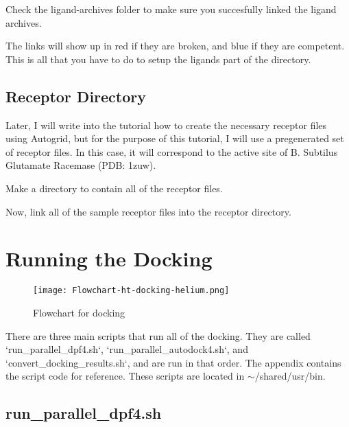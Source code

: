 Check the ligand-archives folder to make sure you succesfully linked the ligand archives.

\begin{quote}
\end{quote}

The links will show up in red if they are broken, and blue if they are competent. This is all that you have to do to setup the ligands part of the directory. 


\subsection{Receptor Directory}

Later, I will write into the tutorial how to create the necessary receptor files using Autogrid, but for the purpose of this tutorial, I will use a pregenerated set of receptor files. In this case, it will correspond to the active site of B. Subtilus Glutamate Racemase (PDB: 1zuw). 

Make a directory to contain all of the receptor files. 

\begin{quote}
\end{quote}

Now, link all of the sample receptor files into the receptor directory.

\begin{quote}
\end{quote}


\section{Running the Docking}

\begin{figure}[h]
  \centering
  \texttt{[image: Flowchart-ht-docking-helium.png]}
  \caption{Flowchart for docking}
\end{figure}

There are three main scripts that run all of the docking. They are called `run\_parallel\_dpf4.sh`, `run\_parallel\_autodock4.sh`, and `convert\_docking\_results.sh`, and are run in that order. The appendix contains the script code for reference. These scripts are located in $\sim$/shared/usr/bin. 

\subsection{run\_parallel\_dpf4.sh}

